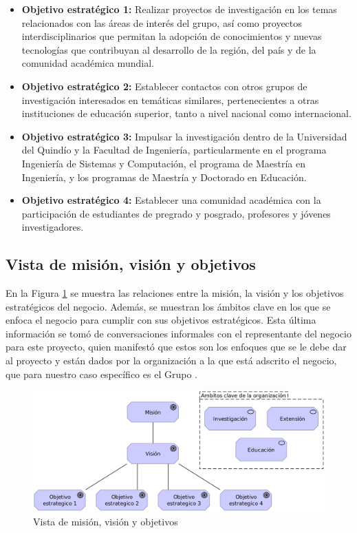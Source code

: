 \begin{itemize}
    \item \textbf{Objetivo estratégico 1:} Realizar proyectos de investigación en los temas relacionados con las áreas de interés del grupo, así como proyectos interdisciplinarios que permitan la adopción de conocimientos y nuevas tecnologías que contribuyan al desarrollo de la región, del país y de la comunidad académica mundial.
    \item \textbf{Objetivo estratégico 2:} Establecer contactos con otros grupos de investigación interesados en temáticas similares, pertenecientes a otras instituciones de educación superior, tanto a nivel nacional como internacional.
    \item \textbf{Objetivo estratégico 3:} Impulsar la investigación dentro de la Universidad del Quindío y la Facultad de Ingeniería, particularmente en el programa Ingeniería de Sistemas y Computación, el programa de Maestría en Ingeniería, y los programas de Maestría y Doctorado en Educación.
    \item \textbf{Objetivo estratégico 4:} Establecer una comunidad académica con la participación de estudiantes de pregrado y posgrado, profesores y jóvenes investigadores.
\end{itemize}

\subsection{Vista de misión, visión y objetivos}
\noindent
        En la Figura \ref{fig:archiMVOView} se muestra las relaciones entre la misión, la visión y los objetivos estratégicos del negocio. Además, se muestran los ámbitos clave en los que se enfoca el negocio para cumplir con sus objetivos estratégicos. Esta última información se tomó de conversaciones informales con el representante del negocio para este proyecto, quien manifestó que estos son los enfoques que se le debe dar al proyecto y están dados por la organización a la que está adscrito el negocio, que para nuestro caso específico es el Grupo \GRID.\begin{figure}[H]
	\centering
	\includegraphics[scale=0.15]{tablas-images/archi/Mission-Values-Vision View.jpg}
	\caption{Vista de misión, visión y objetivos}
    \label{fig:archiMVOView}
\end{figure}


